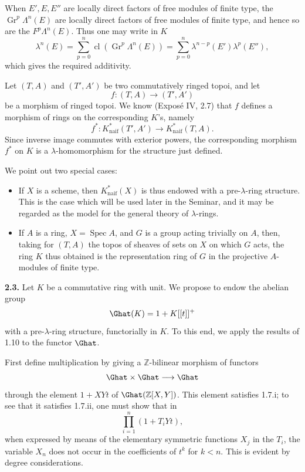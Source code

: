 \documentclass[11pt]{article}
\begin{document}
When \(E',E,E''\) are locally direct factors of free modules of finite type, the \(\operatorname{Gr}^p\Lambda^n(E)\) are locally direct factors of free modules of finite type, and hence so are the \(F^p\Lambda^n(E)\). Thus one may write in \(K\)
\[
  \lambda^n(E)=\sum_{p=0}^{n}\operatorname{cl}(\operatorname{Gr}^p\Lambda^n(E))
  =
  \sum_{p=0}^{n}\lambda^{n-p}(E')\lambda^p(E''),
\]
which gives the required additivity.

Let \((T,A)\) and \((T',A')\) be two commutatively ringed topoi, and let
\[
  f:(T,A)\longrightarrow (T',A')
\]
be a morphism of ringed topoi. We know (Exposé IV, 2.7) that \(f\) defines a morphism of rings on the corresponding \(K\)'s, namely
\[
  f^*:K^*_{\mathrm{naif}}(T',A')\longrightarrow K^*_{\mathrm{naif}}(T,A).
\]
Since inverse image commutes with exterior powers, the corresponding morphism \(f^*\) on \(K\) is a \(\lambda\)-homomorphism for the structure just defined.

We point out two special cases:
\begin{itemize}
\item If \(X\) is a scheme, then \(K^*_{\mathrm{naif}}(X)\) is thus endowed with a pre-\(\lambda\)-ring structure. This is the case which will be used later in the Seminar, and it may be regarded as the model for the general theory of \(\lambda\)-rings.
\item If \(A\) is a ring, \(X=\operatorname{Spec}A\), and \(G\) is a group acting trivially on \(A\), then, taking for \((T,A)\) the topos of sheaves of sets on \(X\) on which \(G\) acts, the ring \(K\) thus obtained is the representation ring of \(G\) in the projective \(A\)-modules of finite type.
\end{itemize}

\textbf{2.3.} Let \(K\) be a commutative ring with unit. We propose to endow the abelian group
\[
  \Ghat(K)=1+K[[t]]^+
\]
with a pre-\(\lambda\)-ring structure, functorially in \(K\). To this end, we apply the results of 1.10 to the functor \(\Ghat\).

First define multiplication by giving a \(\mathbb Z\)-bilinear morphism of functors
\[
  \Ghat\times\Ghat\longrightarrow\Ghat
\]
through the element \(1+XYt\) of \(\Ghat(\mathbb Z[X,Y])\). This element satisfies 1.7.i; to see that it satisfies 1.7.ii, one must show that in
\[
  \prod_{i=1}^{n}(1+T_iYt),
\]
when expressed by means of the elementary symmetric functions \(X_j\) in the \(T_i\), the variable \(X_n\) does not occur in the coefficients of \(t^k\) for \(k<n\). This is evident by degree considerations.
\end{document}
